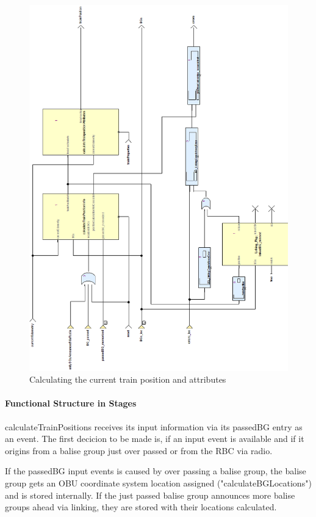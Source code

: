 \begin{figure}[hbtp]
\centering
\includegraphics[scale=0.5]{../images/calculateTrainPosition_decorations.png}
\caption{Calculating the current train position and attributes}
\end{figure}

\paragraph{Functional Structure in Stages}
calculateTrainPositions receives its input information via its passedBG entry as an event. The first decicion to be made is, if an input event is available and if it origins from a balise group just over passed or from the RBC via radio. 

If the passedBG input events is caused by over passing a balise group, the balise group gets an OBU coordinate system location assigned ("calculateBGLocations") and is stored internally. If the just passed balise group announces more balise groups ahead via linking, they are stored with their locations calculated. 

